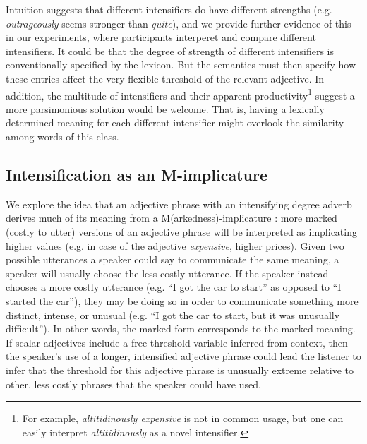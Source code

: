 \documentclass[10pt,letterpaper]{article}
\newcommand{\w}[1]{\emph{#1}}
\begin{document}
Intuition suggests that different intensifiers do have different strengths (e.g. \w{outrageously} seems stronger than \w{quite}), and we provide further evidence of this in our experiments, where participants interperet and compare different intensifiers.
It could be that the degree of strength of different intensifiers is conventionally specified by the lexicon. But the semantics must then specify how these entries affect the very flexible threshold of the relevant adjective.
In addition, the multitude of intensifiers \cite{bolinger} and their apparent productivity\footnote{For example, \w{altitidinously expensive} is not in common usage, but one can easily interpret \w{altitidinously} as a novel intensifier.}
suggest a more parsimonious solution would be welcome. 
That is, having a lexically determined meaning for each different intensifier might overlook the similarity among words of this class.

\subsection{Intensification as an M-implicature}

We explore the idea that an adjective phrase with an intensifying degree adverb derives much of its meaning from a M(arkedness)-implicature \cite{levinson}: more marked (costly to utter) versions of an adjective phrase will be interpreted as implicating higher values (e.g. in case of the adjective \w{expensive}, higher prices). 
Given two possible utterances a speaker could say to communicate the same meaning, a speaker will usually choose the less costly utterance. If the speaker instead chooses a more costly utterance (e.g. ``I got the car to start'' as opposed to ``I started the car''), they may be doing so in order to communicate something more distinct, intense, or unusual (e.g. ``I got the car to start, but it was unusually difficult''). In other words, the marked form corresponds to the marked meaning. If scalar adjectives include a free threshold variable inferred from context, then the speaker's use of a longer, intensified adjective phrase could lead the listener to infer that the threshold for this adjective phrase is unusually extreme relative to other, less costly phrases that the speaker could have used. 
\end{document}
